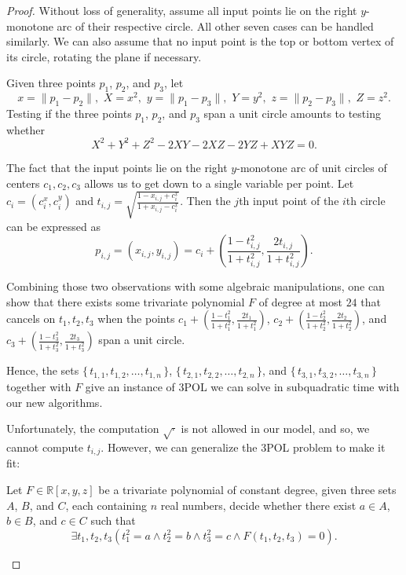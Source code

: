 \begin{proof}
	Without loss of generality, assume all input points lie on the right
	$y$-monotone arc of their respective circle. All other seven cases can be
	handled similarly. We can also assume that no input point is the top or
	bottom vertex of its circle, rotating the plane if necessary.

	Given three points $p_1$, $p_2$, and $p_3$, let
	\begin{displaymath}
		x=\lVert p_1 - p_2 \rVert,\,\,
		X=x^2,\,\,
		y=\lVert p_1 - p_3 \rVert,\,\,
		Y=y^2,\,\,
		z=\lVert p_2 - p_3 \rVert,\,\,
		Z=z^2.
	\end{displaymath}
	Testing if the three points $p_1$, $p_2$, and $p_3$ span a unit circle
	amounts to testing whether
	\begin{displaymath}
		X^2 + Y^2 + Z^2 - 2XY - 2XZ - 2YZ + XYZ = 0.
	\end{displaymath}

	The fact that the input points lie on the right $y$-monotone arc of unit
	circles of centers $c_1,c_2,c_3$ allows us to get down to a single variable
	per point. Let $c_i = (c_i^x,c_i^y)$ and
	$t_{i,j} = \sqrt{\frac{1 - x_{i,j} + c_i^x}{1 + x_{i,j} - c_i^x}}$. Then
	the \(j\)th input point of the \(i\)th circle can be expressed as
	\begin{displaymath}
		p_{i,j} = (x_{i,j},y_{i,j}) = c_i + \left(\frac{1-t_{i,j}^2}{1+t_{i,j}^2},\frac{2
		t_{i,j}}{1+t_{i,j}^2}\right).
	\end{displaymath}

	Combining those two observations with some algebraic manipulations, one can
	show that there exists some trivariate polynomial $F$ of degree at most
	$24$ that cancels on $t_1,t_2,t_3$ when the points $c_1
	+\left(\frac{1-t_1^2}{1+t_1^2},\frac{2t_1}{1+t_1^2}\right)$, $c_2
	+\left(\frac{1-t_2^2}{1+t_2^2},\frac{2t_2}{1+t_2^2}\right)$, and $c_3
	+\left(\frac{1-t_3^2}{1+t_3^2},\frac{2t_3}{1+t_3^2}\right)$ span a unit
	circle.

	Hence, the sets
	$\{\,t_{1,1},t_{1,2},\ldots,t_{1,n}\,\}$,
	$\{\,t_{2,1},t_{2,2},\ldots,t_{2,n}\,\}$, and
	$\{\,t_{3,1},t_{3,2},\ldots,t_{3,n}\,\}$
	together with $F$ give an instance of 3POL we can solve in subquadratic
	time with our new algorithms.

	Unfortunately, the computation $\sqrt{\cdot}$ is not allowed in our model, and
	so, we cannot compute $t_{i,j}$.
	However, we can generalize the 3POL problem to make it fit:
	\begin{problem}
		Let $F \in \mathbb{R}[x,y,z]$ be a trivariate polynomial of constant degree,
		given three sets $A$, $B$, and $C$, each containing $n$ real numbers, decide
		whether there exist $a \in A$, $b \in B$, and $c \in C$ such that
		\begin{displaymath}
			\exists t_1,t_2,t_3
			(t_1^2 = a \land
			t_2^2 = b \land
			t_3^2 = c \land
			F(t_1,t_2,t_3) = 0).
		\end{displaymath}
	\end{problem}


\end{proof}
